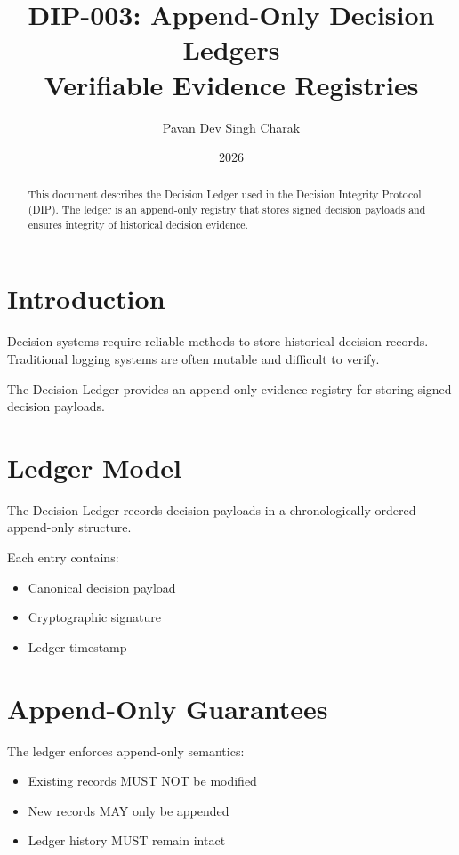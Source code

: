 \documentclass[11pt]{article}
\title{DIP-003: Append-Only Decision Ledgers\\
Verifiable Evidence Registries}
\author{Pavan Dev Singh Charak}
\date{2026}
\begin{document}
\maketitle

\begin{abstract}

This document describes the Decision Ledger used in the
Decision Integrity Protocol (DIP). The ledger is an append-only
registry that stores signed decision payloads and ensures
integrity of historical decision evidence.

\end{abstract}

\section{Introduction}

Decision systems require reliable methods to store
historical decision records. Traditional logging systems
are often mutable and difficult to verify.

The Decision Ledger provides an append-only evidence
registry for storing signed decision payloads.

\section{Ledger Model}

The Decision Ledger records decision payloads in a
chronologically ordered append-only structure.

Each entry contains:

\begin{itemize}
\item Canonical decision payload
\item Cryptographic signature
\item Ledger timestamp
\end{itemize}

\section{Append-Only Guarantees}

The ledger enforces append-only semantics:

\begin{itemize}
\item Existing records MUST NOT be modified
\item New records MAY only be appended
\item Ledger history MUST remain intact
\end{itemize}
\end{document}
